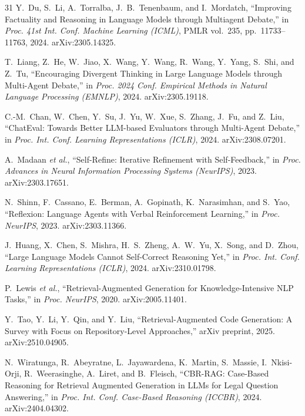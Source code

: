 \documentclass[lettersize,journal]{IEEEtran}
\begin{document}
\begin{thebibliography}{31}
Y.~Du, S.~Li, A.~Torralba, J.~B.~Tenenbaum, and I.~Mordatch, ``Improving Factuality and Reasoning in Language Models through Multiagent Debate,'' in \textit{Proc. 41st Int. Conf. Machine Learning (ICML)}, PMLR vol.~235, pp.~11733--11763, 2024. arXiv:2305.14325.

T.~Liang, Z.~He, W.~Jiao, X.~Wang, Y.~Wang, R.~Wang, Y.~Yang, S.~Shi, and Z.~Tu, ``Encouraging Divergent Thinking in Large Language Models through Multi-Agent Debate,'' in \textit{Proc. 2024 Conf. Empirical Methods in Natural Language Processing (EMNLP)}, 2024. arXiv:2305.19118.

C.-M.~Chan, W.~Chen, Y.~Su, J.~Yu, W.~Xue, S.~Zhang, J.~Fu, and Z.~Liu, ``ChatEval: Towards Better LLM-based Evaluators through Multi-Agent Debate,'' in \textit{Proc. Int. Conf. Learning Representations (ICLR)}, 2024. arXiv:2308.07201.

A.~Madaan \textit{et al.}, ``Self-Refine: Iterative Refinement with Self-Feedback,'' in \textit{Proc. Advances in Neural Information Processing Systems (NeurIPS)}, 2023. arXiv:2303.17651.

N.~Shinn, F.~Cassano, E.~Berman, A.~Gopinath, K.~Narasimhan, and S.~Yao, ``Reflexion: Language Agents with Verbal Reinforcement Learning,'' in \textit{Proc. NeurIPS}, 2023. arXiv:2303.11366.

J.~Huang, X.~Chen, S.~Mishra, H.~S.~Zheng, A.~W.~Yu, X.~Song, and D.~Zhou, ``Large Language Models Cannot Self-Correct Reasoning Yet,'' in \textit{Proc. Int. Conf. Learning Representations (ICLR)}, 2024. arXiv:2310.01798.

P.~Lewis \textit{et al.}, ``Retrieval-Augmented Generation for Knowledge-Intensive NLP Tasks,'' in \textit{Proc. NeurIPS}, 2020. arXiv:2005.11401.

Y.~Tao, Y.~Li, Y.~Qin, and Y.~Liu, ``Retrieval-Augmented Code Generation: A Survey with Focus on Repository-Level Approaches,'' arXiv preprint, 2025. arXiv:2510.04905.

N.~Wiratunga, R.~Abeyratne, L.~Jayawardena, K.~Martin, S.~Massie, I.~Nkisi-Orji, R.~Weerasinghe, A.~Liret, and B.~Fleisch, ``CBR-RAG: Case-Based Reasoning for Retrieval Augmented Generation in LLMs for Legal Question Answering,'' in \textit{Proc. Int. Conf. Case-Based Reasoning (ICCBR)}, 2024. arXiv:2404.04302.


\end{thebibliography}
\end{document}

